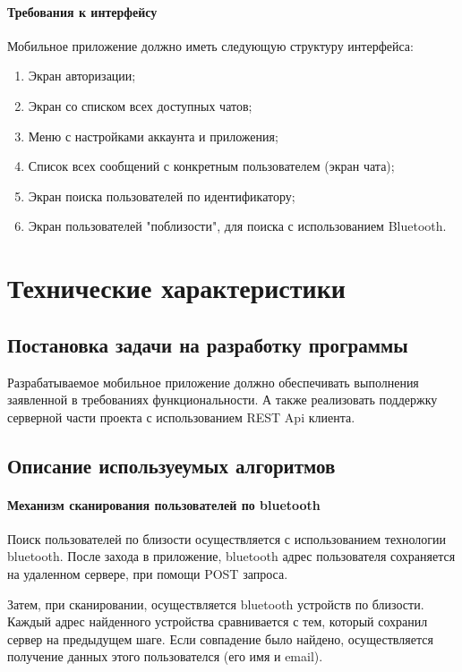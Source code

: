 \documentclass[explnote]{espd}
\begin{document}
\paragraph{Требования к интерфейсу}

Мобильное приложение должно иметь следующую структуру интерфейса:

\begin{enumerate}
\item Экран авторизации;
\item Экран со списком всех доступных чатов;
\item Меню с настройками аккаунта и приложения;
\item Список всех сообщений с конкретным пользователем (экран чата);
\item Экран поиска пользователей по идентификатору;
\item Экран пользователей "поблизости", для поиска с использованием Bluetooth.
\end{enumerate}

\section{Технические характеристики}
\subsection{Постановка задачи на разработку программы}
Разрабатываемое мобильное приложение должно обеспечивать выполнения заявленной в требованиях функциональности. А также реализовать поддержку серверной части проекта с использованием REST Api клиента. 

\subsection{Описание используеумых алгоритмов}
\paragraph{Механизм сканирования пользователей по bluetooth}
Поиск пользователей по близости осуществляется с использованием технологии bluetooth. После захода в приложение, bluetooth адрес пользователя сохраняется на удаленном сервере, при помощи POST запроса.

Затем, при сканировании, осуществляется bluetooth устройств по близости. Каждый адрес найденного устройства сравнивается с тем, который сохранил сервер на предыдущем шаге. Если совпадение было найдено, осуществляется получение данных этого пользователся (его имя и email).
\end{document}
